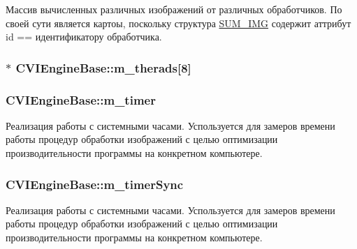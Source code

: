 Массив вычисленных различных изображений от различных обработчиков. По своей сути является картоы, поскольку структура \hyperlink{class_s_u_m___i_m_g}{S\+U\+M\+\_\+\+I\+M\+G} содержит аттрибут id == идентификатору обработчика. 

\hypertarget{class_c_v_i_engine_base_a4fdf197fd70d474cf4365abba485c461}{
\subsubsection[{m\+\_\+therads}]{$\ast$ C\+V\+I\+Engine\+Base\+::m\+\_\+therads\mbox{[}8\mbox{]}}}\label{class_c_v_i_engine_base_a4fdf197fd70d474cf4365abba485c461}




\hypertarget{class_c_v_i_engine_base_a928c4511d2e46b9cd4b7c9b3b7322855}{
\subsubsection[{m\+\_\+timer}]{ C\+V\+I\+Engine\+Base\+::m\+\_\+timer}}\label{class_c_v_i_engine_base_a928c4511d2e46b9cd4b7c9b3b7322855}


Реализация работы с системными часами. Успользуется для замеров времени работы процедур обработки изображений с целью оптимизации производительности программы на конкретном компьютере. 

\hypertarget{class_c_v_i_engine_base_a8709ba629c654585cc38d13ccf3a23b8}{
\subsubsection[{m\+\_\+timer\+Sync}]{ C\+V\+I\+Engine\+Base\+::m\+\_\+timer\+Sync}}\label{class_c_v_i_engine_base_a8709ba629c654585cc38d13ccf3a23b8}


Реализация работы с системными часами. Успользуется для замеров времени работы процедур обработки изображений с целью оптимизации производительности программы на конкретном компьютере. 

